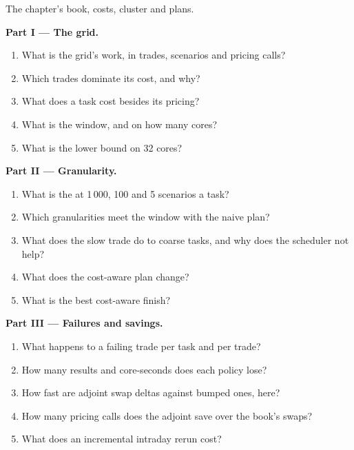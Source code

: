 \begin{problem}\label{pb:pl:the-risk-grid:1}
The chapter's book, costs, cluster and plans.

\medskip\noindent\textbf{Part I --- The grid.}
\begin{enumerate}
\item What is the grid's work, in trades, scenarios and pricing calls?
\item Which trades dominate its cost, and why?
\item What does a task cost besides its pricing?
\item What is the window, and on how many cores?
\item What is the lower bound on 32 cores?
\end{enumerate}

\medskip\noindent\textbf{Part II --- Granularity.}
\begin{enumerate}[resume]
\item What is the  at 1\,000, 100 and 5 scenarios a task?
\item Which granularities meet the window with the naive plan?
\item What does the slow trade do to coarse tasks, and why does the scheduler not help?
\item What does the cost-aware plan change?
\item What is the best cost-aware finish?
\end{enumerate}

\medskip\noindent\textbf{Part III --- Failures and savings.}
\begin{enumerate}[resume]
\item What happens to a failing trade per task and per trade?
\item How many results and core-seconds does each policy lose?
\item How fast are adjoint swap deltas against bumped ones, here?
\item How many pricing calls does the adjoint save over the book's swaps?
\item What does an incremental intraday rerun cost?
\end{enumerate}


\end{problem}
